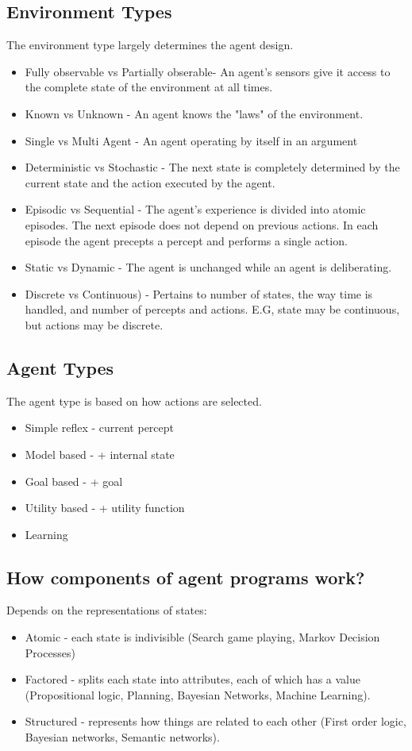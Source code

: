 \documentclass[11pt, oneside]{article}   	%
\begin{document}
\subsection{Environment Types}
The environment type largely determines the agent design.
\begin{itemize}
\item Fully observable vs Partially obserable- An agent's sensors give it access to the complete state of the environment at all times.
\item Known vs Unknown - An agent knows the "laws" of the environment.
\item Single vs Multi Agent - An agent operating by itself in an argument
\item Deterministic vs Stochastic - The next state is completely determined by the current state and the action executed by the agent.
\item Episodic vs Sequential - The agent's experience is divided into atomic episodes. The next episode does not depend on previous actions. In each episode the agent precepts a percept and performs a single action.
\item Static vs Dynamic - The agent is unchanged while an agent is deliberating.
\item Discrete vs Continuous) - Pertains to number of states, the way time is handled, and number of percepts and actions. E.G, state may be continuous, but actions may be discrete.
\end{itemize}
\subsection{Agent Types}
The agent type is based on how actions are selected.
\begin{itemize}
\item Simple reflex - current percept
\item Model based - + internal state
\item Goal based - + goal
\item Utility based - + utility function
\item Learning
\end{itemize}

\subsection{How components of agent programs work?}
Depends on the representations of states:
\begin{itemize}
\item Atomic - each state is indivisible (Search game playing, Markov Decision Processes)
\item Factored - splits each state into attributes, each of which has a value (Propositional logic, Planning, Bayesian Networks, Machine Learning).
\item Structured - represents how things are related to each other (First order logic, Bayesian networks, Semantic networks).
\end{itemize}
\end{document}
